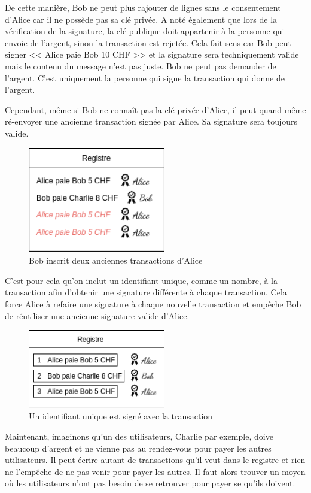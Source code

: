 De cette manière, Bob ne peut plus rajouter de lignes sans le consentement d'Alice car il ne possède pas sa clé privée. A noté également que lors de la vérification de la signature, la clé publique doit appartenir à la personne qui envoie de l'argent, sinon la transaction est rejetée. Cela fait sens car Bob peut signer << Alice paie Bob 10 CHF >> et la signature sera techniquement valide mais le contenu du message n'est pas juste. Bob ne peut pas demander de l'argent. C'est uniquement la personne qui signe la transaction qui donne de l'argent. 

Cependant, même si Bob ne connaît pas la clé privée d'Alice, il peut quand même ré-envoyer une ancienne transaction signée par Alice. Sa signature sera toujours valide.

\begin{figure}[H]
  \centering
  \includegraphics[width=6cm]{images/crypto_4.png}
  \caption{Bob inscrit deux anciennes transactions d'Alice}
\end{figure}

C'est pour cela qu'on inclut un identifiant unique, comme un nombre, à la transaction afin d'obtenir une signature différente à chaque transaction. Cela force Alice à refaire une signature à chaque nouvelle transaction et empêche Bob de réutiliser une ancienne signature valide d'Alice.

\begin{figure}[H]
  \centering
  \includegraphics[width=6cm]{images/crypto_5.png}
  \caption{Un identifiant unique est signé avec la transaction}
\end{figure}

Maintenant, imaginons qu'un des utilisateurs, Charlie par exemple, doive beaucoup d'argent et ne vienne pas au rendez-vous pour payer les autres utilisateurs. Il peut écrire autant de transactions qu'il veut dans le registre et rien ne l'empêche de ne pas venir pour payer les autres. Il faut alors trouver un moyen où les utilisateurs n'ont pas besoin de se retrouver pour payer se qu'ils doivent.

